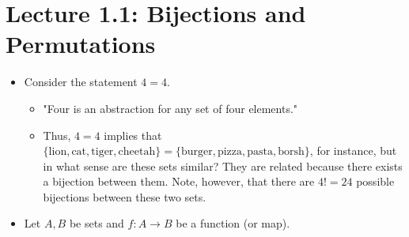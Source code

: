 \documentclass[../apprentice.tex]{subfiles}
\begin{document}
\section{Lecture 1.1: Bijections and Permutations}
\begin{itemize}
    \item Consider the statement $4=4$.
    \begin{itemize}
        \item "Four is an abstraction for any set of four elements."
        \item Thus, $4=4$ implies that $\{\text{lion},\text{cat},\text{tiger},\text{cheetah}\}=\{\text{burger},\text{pizza},\text{pasta},\text{borsh}\}$, for instance, but in what sense are these sets similar? They are related because there exists a bijection between them. Note, however, that there are $4!=24$ possible bijections between these two sets.
    \end{itemize}
    \item Let $A,B$ be sets and $f:A\to B$ be a function (or map).
    \begin{figure}[h!]
        \centering
\end{figure}
\end{itemize}
\end{document}
